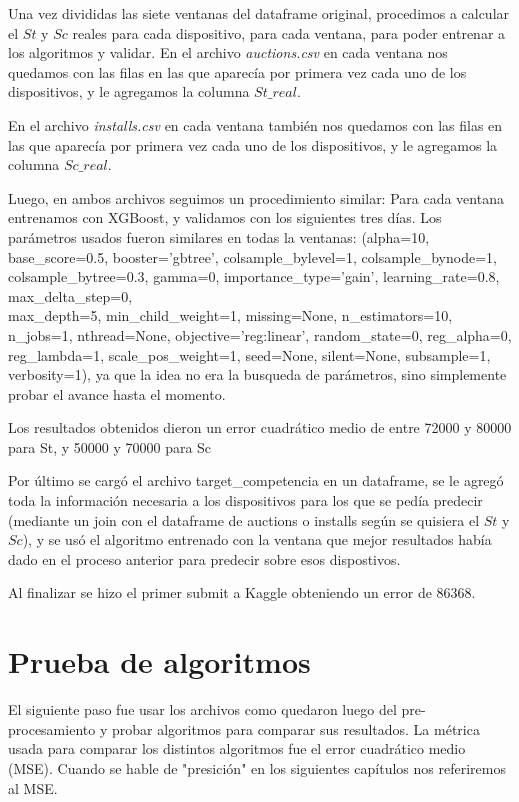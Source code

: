\documentclass{article}
\begin{document}
Una vez divididas las siete ventanas del dataframe original, procedimos a calcular el $St$ y $Sc$ reales para cada dispositivo, para cada ventana, para poder entrenar a los algoritmos y validar. 
En el archivo \textit{auctions.csv} en cada ventana nos quedamos con las filas en las que aparecía por primera vez cada uno de los dispositivos, y le agregamos la columna $St\_real$.

En el archivo \textit{installs.csv} en cada ventana también nos quedamos con las filas en las que aparecía por primera vez cada uno de los dispositivos, y le agregamos la columna $Sc\_real$.

Luego, en ambos archivos seguimos un procedimiento similar: Para cada ventana entrenamos con XGBoost, y validamos con los siguientes tres días. Los parámetros usados fueron similares en todas la ventanas: 
(alpha=10, base\_score=0.5, booster='gbtree', colsample\_bylevel=1, colsample\_bynode=1, colsample\_bytree=0.3, gamma=0, importance\_type='gain', learning\_rate=0.8, max\_delta\_step=0, \\max\_depth=5, min\_child\_weight=1, missing=None, n\_estimators=10, n\_jobs=1, nthread=None, objective='reg:linear', random\_state=0, reg\_alpha=0, reg\_lambda=1, scale\_pos\_weight=1, seed=None, silent=None, subsample=1, verbosity=1), ya que la idea no era la busqueda de parámetros, sino simplemente probar el avance hasta el momento.

Los resultados obtenidos dieron un error cuadrático medio de entre 72000 y 80000 para St, y 50000 y 70000 para Sc

Por último se cargó el archivo target\_competencia en un dataframe, se le agregó toda la información necesaria a los dispositivos para los que se pedía predecir (mediante un join con el dataframe de auctions o installs según se quisiera el $St$ y $Sc$), y se usó el algoritmo entrenado con la ventana que mejor resultados había dado en el proceso anterior para predecir sobre esos dispostivos.

Al finalizar se hizo el primer submit a Kaggle obteniendo un error de 86368.

\newpage
\section{Prueba de algoritmos}
El siguiente paso fue usar los archivos como quedaron luego del pre-procesamiento y probar algoritmos para comparar sus resultados. La métrica usada para comparar los distintos algoritmos fue el error cuadrático medio (MSE). Cuando se hable de "presición" en los siguientes capítulos nos referiremos al MSE.
\end{document}

